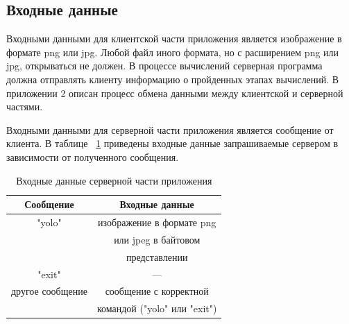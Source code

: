 \documentclass[a4paper,english]{G2-105}
\begin{document}
\subsection{Входные данные}
\par Входными данными для клиентской части приложения является изображение в формате png или jpg. Любой файл иного формата, но с расширением png или jpg, открываться не должен. В процессе вычислений серверная программа должна отправлять клиенту информацию о пройденных этапах вычислений. В приложении 2 описан процесс обмена данными между клиентской и серверной частями.
\par Входными данными для серверной части приложения является сообщение от клиента. В таблице ~\ref{input} приведены входные данные запрашиваемые сервером в зависимости от полученного сообщения.
\begin{longtable}{|c|c|}
    \caption{Входные данные серверной части приложения} \label{input} \\ \hline
    Сообщение        & Входные данные            \\ \hline \endhead
    "yolo"           & изображение в формате png \\ 
                     & или jpeg в байтовом       \\
                     & представлении             \\ \hline
    "exit"           & ---                       \\ \hline
    другое сообщение & сообщение с корректной    \\  
    	                 & командой ("yolo" или "exit") \\
\end{longtable}
\end{document}
